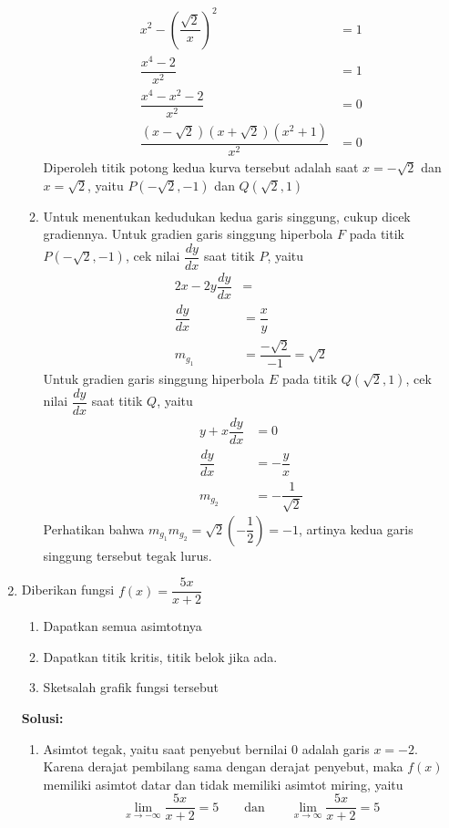 \documentclass{article}
\begin{document}
\begin{enumerate}
\begin{enumerate}
		\begin{align*}
		x^2-\left(\dfrac{\sqrt{2}}{x}\right)^2&=1\\
		\dfrac{x^4-2}{x^2} &= 1\\
		\dfrac{x^4-x^2-2}{x^2} &= 0 \\
		\dfrac{(x-\sqrt{2})(x+\sqrt{2})(x^2+1)}{x^2} &= 0
		\end{align*}
		Diperoleh titik potong kedua kurva tersebut adalah saat $x=-\sqrt{2}$ dan $x=\sqrt{2}$, yaitu $P(-\sqrt{2},-1)$ dan $Q(\sqrt{2},1)$
		\item Untuk menentukan kedudukan kedua garis singgung, cukup dicek gradiennya. Untuk gradien garis singgung hiperbola $F$ pada titik $P(-\sqrt{2},-1)$, cek nilai $\dfrac{dy}{dx}$ saat titik $P$, yaitu
		\begin{align*}
		2x-2y\dfrac{dy}{dx} &= \\
		\dfrac{dy}{dx} &= \dfrac{x}{y} \\
		m_{g_1}&= \dfrac{-\sqrt{2}}{-1} = \sqrt{2}
		\end{align*}
		Untuk gradien garis singgung hiperbola $E$ pada titik $Q(\sqrt{2},1)$, cek nilai $\dfrac{dy}{dx}$ saat titik $Q$, yaitu
		\begin{align*}
		y+x\dfrac{dy}{dx} &= 0\\
		\dfrac{dy}{dx} &= -\dfrac{y}{x}\\
		m_{g_2} &= -\dfrac{1}{\sqrt{2}}
		\end{align*}
		Perhatikan bahwa $m_{g_1}m_{g_2}=\sqrt{2}\left(-\dfrac{1}{2}\right)=-1$, artinya kedua garis singgung tersebut tegak lurus.
	\end{enumerate}
	\item Diberikan fungsi $f(x)=\dfrac{5x}{x+2}$
	\begin{enumerate}
		\item Dapatkan semua asimtotnya
		\item Dapatkan titik kritis, titik belok jika ada.
		\item Sketsalah grafik fungsi tersebut
	\end{enumerate}
	\textbf{Solusi:}
	\begin{enumerate}
		\item Asimtot tegak, yaitu saat penyebut bernilai 0 adalah garis $x=-2$.\\ Karena derajat pembilang sama dengan derajat penyebut, maka $f(x)$ memiliki asimtot datar dan tidak memiliki asimtot miring, yaitu 
		$$ \lim_{x\rightarrow -\infty} \dfrac{5x}{x+2} = 5 \qquad \text{dan} \qquad \lim_{x\rightarrow \infty} \dfrac{5x}{x+2} = 5 $$

\end{enumerate}
\end{enumerate}
\end{document}
